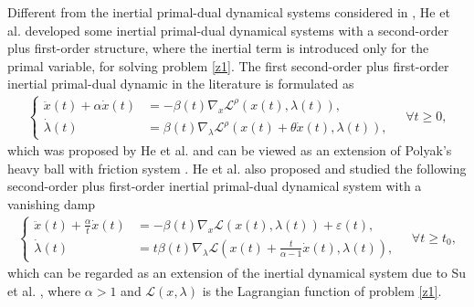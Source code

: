 \documentclass[review]{elsarticle}
\begin{document}
Different from the inertial primal-dual dynamical systems considered in \cite{ZengXLandLeiJLandChenJ(2022),HeHuFangetal(2021), AttouchADMM(2022),BNguyen2022,HHFIPD2023}, He et al. \cite{HeHFetal(2022),HeHFiietal(2022)}  developed some inertial primal-dual dynamical systems with a second-order plus first-order structure, where the inertial term is introduced only for the primal variable,  for solving problem \eqref{z1}.
The first second-order plus first-order inertial primal-dual dynamic in the literature is formulated as
\begin{eqnarray*}
		\begin{cases}
		\ddot{x}(t)+\alpha\dot{x}(t)& = -\beta(t)\nabla_x \mathcal{L}^{\rho}(x(t),\lambda(t)),\\
		 \dot{\lambda}(t) &=\beta(t)\nabla_{\lambda}\mathcal{L}^{\rho}(x(t)+\theta\dot{x}(t),\lambda(t)),
	\end{cases}
\quad\forall t\ge 0,
	\end{eqnarray*}
which was proposed  by He et al. \cite{HeHFetal(2022)} and can be viewed as an extension of  Polyak's  heavy ball with friction system \cite{Polyak(1964)}. He et al. also \cite{HeHFiietal(2022)} proposed  and studied the following  second-order plus first-order inertial primal-dual dynamical system with a vanishing damp
	\begin{eqnarray*}
				\begin{cases}
			\ddot{x}(t)+\frac{\alpha}{t}\dot{x}(t)&=-\beta(t)\nabla_x \mathcal{L}(x(t),\lambda(t))
			+\varepsilon(t),\\
			\dot{\lambda}(t)&=t\beta(t)\nabla_{\lambda} \mathcal{L}(x(t)+\frac{t}{\alpha-1}\dot{x}(t),\lambda(t)), 
		\end{cases}\quad\forall t\ge t_0,
	\end{eqnarray*}
which can be regarded as an extension of the inertial dynamical system due to Su et al. \cite{SuBoydandCandes(2016)},	where $\alpha>1$ and $\mathcal{L}(x,\lambda)$ is the  Lagrangian function of problem \eqref{z1}.
\end{document}
